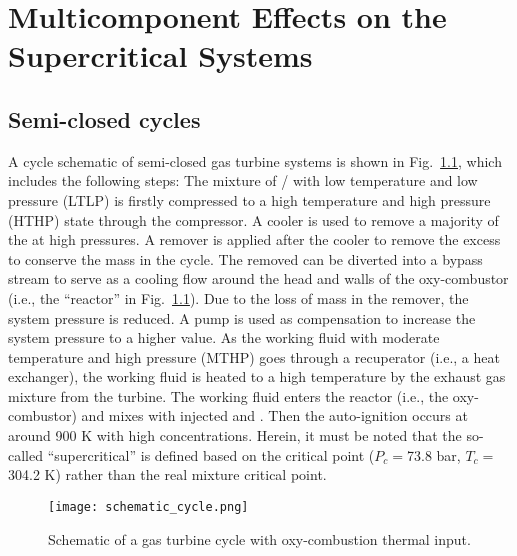 \chapter{Multicomponent Effects on the Supercritical  Systems}


\section{Semi-closed  cycles} \label{app:sCO2cycle}
    A cycle schematic of semi-closed  gas turbine systems is shown in Fig.~\ref{fig1}, which includes the following steps: The mixture of / with low temperature and low pressure (LTLP) is firstly compressed to a high temperature and high pressure (HTHP) state through the compressor. A cooler is used to remove a majority of the  at high pressures. %
    A remover is applied after the cooler to remove the excess  to conserve the mass in the cycle. The removed  can be diverted into a bypass stream to serve as a cooling flow around the head and walls of the oxy-combustor (i.e., the ``reactor'' in Fig.~\ref{fig1}). Due to the loss of mass in the remover, the system pressure is reduced. A pump is used as compensation to increase the system pressure to a higher value. As the working fluid with moderate temperature and high pressure (MTHP) goes through a recuperator (i.e., a heat exchanger), the working fluid is heated to a high temperature by the exhaust gas mixture from the turbine. The working fluid enters the reactor (i.e., the oxy-combustor) and mixes with injected  and . Then the auto-ignition occurs at around 900 K with high  concentrations. Herein, it must be noted that the so-called ``supercritical'' is defined based on the  critical point ($P_c=$73.8 bar, $T_c=$304.2 K) rather than the real mixture critical point.
    \begin{figure}[htbp]
        \begin{center}
            \texttt{[image: schematic\_cycle.png]}
        \end{center}
        \caption{Schematic of a  gas turbine cycle with oxy-combustion thermal input.}
        \label{fig1}
    \end{figure}


